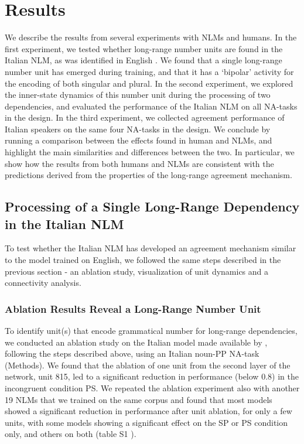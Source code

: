 \section{Results}
We describe the results from several experiments with NLMs and humans. In the first experiment, we tested whether long-range number units are found in the Italian NLM, as was identified in English \citep{lakretz2019emergence}. We found that a single long-range number unit has emerged during training, and that it has a `bipolar' activity for the encoding of both singular and plural. In the second experiment, we explored the inner-state dynamics of this number unit during the processing of two dependencies, and evaluated the performance of the Italian NLM on all NA-tasks in the design. In the third experiment, we collected agreement performance of Italian speakers on the same four NA-tasks in the design. We conclude by running a comparison between the effects found in human and NLMs, and highlight the main similarities and differences between the two. In particular, we show how the results from both humans and NLMs are consistent with the predictions derived from the properties of the long-range agreement mechanism. 

\subsection{Processing of a Single Long-Range Dependency in the Italian NLM}
To test whether the Italian NLM has developed an agreement mechanism similar to the model trained on English, we followed the same steps described in the previous section - an ablation study, visualization of unit dynamics and a connectivity analysis.

\subsubsection{Ablation Results Reveal a Long-Range Number Unit} To identify unit(s) that encode grammatical number for long-range dependencies, we conducted an ablation study on the Italian model made available by \citet{Gulordava:etal:2018}, following the steps described above, using an Italian noun-PP NA-task (Methods). We found that the ablation of one unit from the second layer of the network, unit 815, led to a significant reduction in performance (below 0.8) in the incongruent condition PS. 
We repeated the ablation experiment also with another 19 NLMs that we trained on the same corpus and found that most models showed a significant reduction in performance after unit ablation, for only a few units, with some models showing a significant effect on the SP or PS condition only, and others on both (table S1 ). 

